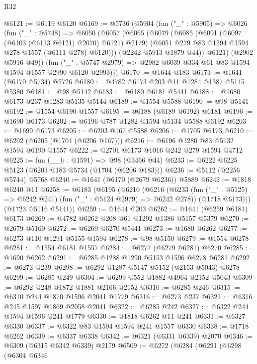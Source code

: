 \begin{lexlean}{R32}
\begin{coremodule}
@6121 := @6119 @6120
@6169 := @5736
    (@5904
      (fun ("_" : @5905) =>
      @6026
        (fun ("_" : @5748) =>
        @6050
          (@6057
            (@6065
              (@6079
                (@6085
                  (@6091 (@6097 (@6103 (@6113 @6121) @2070) @6121) @2179)
                  (@6051 @279 @83 @1594 @1594 @278 @1557 (@6111 @278) @6120)))
              (@2242 @5913 @1879 @44))
            @6121)
          (@2902 @5916 @49))
        (fun ("_" : @5747 @2979) => @2982 @6039 @334 @61 @83 @1594 @1594 @1557 @2990 @6120 @2993)))
@6170 := @1644 @183
@6173 := @1641 (@6170 @5734) @5726
@6180 := @4782 @6173 @203 @11 @1284 @1387 @5145 @5380
@6181 := @98 @5142
@6183 := @6180 @6181 @5441
@6188 := @1680 @6173 @237 @1283 @5135 @5144
@6189 := @1554 @5588
@6190 := @98 @5141
@6192 := @1554 @6190 @1557
@6195 := @6188 (@6189 @6192) @6181
@6196 := @1690 @6173
@6202 := @6196 @787 @1282 @1594 @5134 @5588 @6192
@6203 := @1699 @6173
@6205 := @6203 @167 @5588
@6206 := @1705 @6173
@6210 := @6202 (@6205 (@1704 (@6206 @167)))
@6216 := @6196 @1280 @83 @5132 @1594 @6190 @1557
@6222 := @2701 @6173 @1016 @242 @279 @1594 @4712
@6225 := fun (__b : @1591) => @98 (@3466 @44)
@6233 := @6222 @6225 @5123 (@6203 @183 @5734 (@1704 (@6206 @183)))
@6236 := @5112 (@2256 @5744) @5768
@6240 := @1641 (@6170 (@2679 @6236)) @5889
@6242 := @1818 @6240 @11
@6258 := @6183
    (@6195
      (@6210
        (@6216
          (@6233 (fun ("_" : @5125) => @6242 @241) (fun ("_" : @5124 @2979) => @6242 @278))
          (@1718 @6173)))
      (@1723 @5116 @5141))
@6259 := @1644 @203
@6262 := @1641 (@6259 @6181) @6173
@6269 := @4782 @6262 @208 @61 @1292 @1386 @5157 @5379
@6270 := @2679 @5160
@6272 := @6269 @6270 @5441
@6273 := @1680 @6262
@6277 := @6273 @110 @1291 @5155 @1594
@6278 := @98 @5150
@6279 := @1554 @6278
@6281 := @1554 @6181 @1557
@6284 := @6277 (@6279 @6281) @6270
@6285 := @1690 @6262
@6291 := @6285 @1288 @1290 @5153 @1596 @6278 @6281
@6292 := @6273 @239
@6298 := @6292 @1287 @5147 @5152 (@2153 @5043) @6278
@6299 := @6285 @249
@6304 := @6299 @552 @1882 @4964 @2152 @5043
@6309 := @6292 @248 @1872 @1881 @2166 @2152
@6310 := @6285 @246
@6315 := @6310 @244 @1870 @1596 @2041 @1779
@6316 := @6273 @237
@6321 := @6316 @245 @1597 @1869 @2058 @2041
@6322 := @6285 @242
@6327 := @6322 @244 @1594 @1596 @241 @1779
@6330 := @1818 @6262 @11 @241
@6331 := @6327 @6330
@6337 := @6322 @83 @1594 @1594 @241 @1557 @6330
@6338 := @1718 @6262
@6339 := @6337 @6338
@6342 := @6321 (@6331 @6339) @2070
@6346 := @6309 (@6315 @6342 @6339) @2179
@6509 := @6272
    (@6284
      (@6291
        (@6298
          (@6304
            @6346

\end{coremodule}
\end{lexlean}
